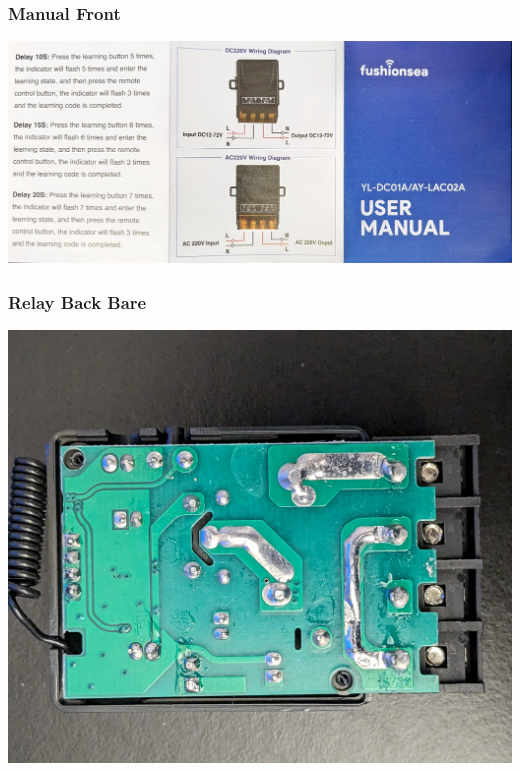 \documentclass{beamer}
\begin{document}
\begin{frame}
\frametitle{Manual Front}
\includegraphics[width=\textwidth]{../Pics/device/manual_front.jpg}
\end{frame}

\begin{frame}
\frametitle{Relay Back Bare}
\includegraphics[width=\textwidth]{../Pics/device/relay_back_bare.jpg}
\end{frame}
\end{document}
